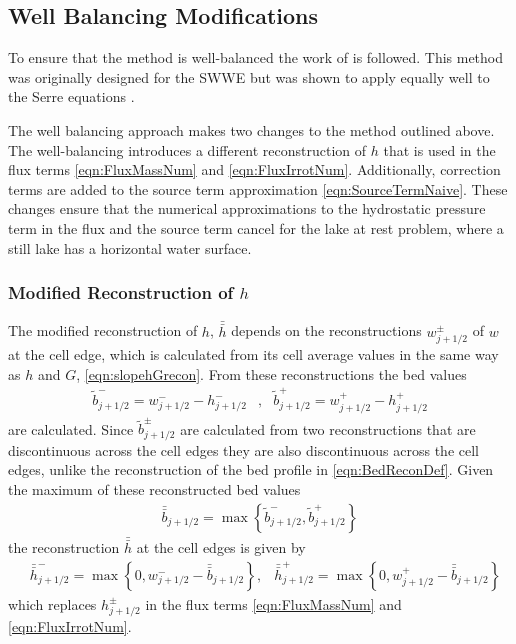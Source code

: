 \documentclass[times]{elsarticle}
\begin{document}
\subsection{Well Balancing Modifications}
To ensure that the method is well-balanced the work of \citet{Klein-etal-2004-2050} is followed. This method was originally designed for the SWWE but was shown to apply equally well to the Serre equations \cite{Pitt-J-2014}.

The well balancing approach makes two changes to the method outlined above. The well-balancing introduces a different reconstruction of $h$ that is used in the flux terms \eqref{eqn:FluxMassNum} and \eqref{eqn:FluxIrrotNum}. Additionally, correction terms are added to the source term approximation \eqref{eqn:SourceTermNaive}. These changes ensure that the numerical approximations to the hydrostatic pressure term in the flux and the source term cancel for the lake at rest problem, where a still lake has a horizontal water surface.

\subsubsection{Modified Reconstruction of $h$}
The modified reconstruction of $h$, $\bar{\bar{h}}$ depends on the reconstructions $w^\pm_{j+1/2}$ of $w$ at the cell edge, which is calculated from its cell average values in the same way as $h$ and $G$, \eqref{eqn:slopehGrecon}. From these reconstructions the bed values
\begin{align*}
\tilde{b}^-_{j+1/2} = w^-_{j+1/2} - h^-_{j+1/2} &, &\tilde{b}^+_{j+1/2} = w^+_{j+1/2} - h^+_{j+1/2}
\end{align*}
are calculated. Since $\tilde{b}^\pm_{j+1/2}$ are calculated from two reconstructions that are discontinuous across the cell edges they are also discontinuous across the cell edges, unlike the reconstruction of the bed profile in \eqref{eqn:BedReconDef}. Given the maximum of these reconstructed bed values
\begin{align*}
\bar{\bar{b}}_{j+1/2} = \max\left\lbrace\tilde{b}^-_{j+1/2} , \tilde{b}^+_{j+1/2} \right\rbrace
\end{align*}
the reconstruction $\bar{\bar{h}}$ at the cell edges is given by
\begin{align}
&\bar{\bar{h}}^-_{j+1/2} = \max\left\lbrace 0, w^-_{j+1/2} - \bar{\bar{b}}_{j+1/2}  \right\rbrace, &\bar{\bar{h}}^+_{j+1/2} = \max\left\lbrace 0, w^+_{j+1/2} - \bar{\bar{b}}_{j+1/2} \right\rbrace
\label{eqn:ModifiedHValue}
\end{align}
which replaces $h^\pm_{j+1/2}$ in the flux terms \eqref{eqn:FluxMassNum} and \eqref{eqn:FluxIrrotNum}.
\end{document}
